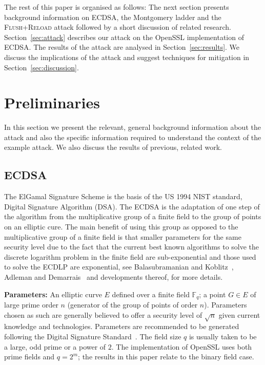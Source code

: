 \documentclass[twocolumn]{svjour3}
\newcommand{\F}{{\mathbb F}}
\begin{document}
The rest of this paper is organised as follows: The next section presents background information on ECDSA, the Montgomery ladder and the \textsc{Flush+Reload} attack followed by a short discussion of related research. %
Section~\ref{sec:attack} describes our attack on the OpenSSL implementation of ECDSA.
The results of the attack are analysed in Section~\ref{sec:results}.
We discuss the implications of the attack and suggest techniques for mitigation in Section~\ref{sec:discussion}.

\section{Preliminaries}\label{sec:background}
In this section we present the relevant, general background information about the attack and also the specific information required to understand the context of the example attack. We also discuss the results of previous, related work.

\subsection{ECDSA}\label{sub:ecdsa}

The ElGamal Signature Scheme \cite{Elgamal85} is the basis of the US 1994 NIST standard, Digital Signature Algorithm (DSA). The ECDSA is the adaptation of one step of the algorithm from the multiplicative group of a finite field to the group of points on an elliptic cure. The main benefit of using this group as opposed to the multiplicative group of a finite field is that smaller parameters for the same security level \cite{koblitz87elliptic,miller85use} due to the fact that the current best known algorithms to solve the discrete logarithm problem in the finite field are sub-exponential and those used to solve the ECDLP are exponential, see Balasubramanian and Koblitz~\cite{balasubramanian-koblitz}, Adleman and Demarrais~\cite{adelman-demarrais} and developments thereof, for more details. 


{\bf{Parameters:}} An elliptic curve $E$ defined over a finite field $\F_{q}$; a point $G\in E$ of large prime order $n$ (generator of the group of points of order $n$). Parameters chosen as such are generally believed to offer a security level of $\sqrt{n}$ given current knowledge and technologies. Parameters are recommended to be generated following the Digital Signature Standard~\cite{fips}. The field size $q$ is usually taken to be a large, odd prime or a power of $2$. The implementation of OpenSSL uses both prime fields and $q=2^m$; the results in this paper relate to the binary field case.
\end{document}
